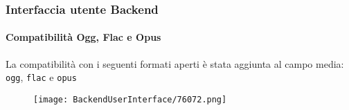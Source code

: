 \begin{frame}[fragile]
	\frametitle{Interfaccia utente Backend}
	\framesubtitle{Compatibilità Ogg, Flac e Opus}

	La compatibilità con i seguenti formati aperti è stata aggiunta al campo media:
	\texttt{ogg}, \texttt{flac} e \texttt{opus}

	\begin{figure}
		\texttt{[image: BackendUserInterface/76072.png]}
	\end{figure}

\end{frame}


